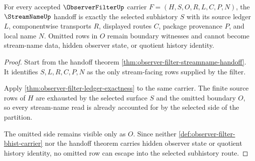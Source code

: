 \begin{theorem}
\label{thm:observer-filter-streamname-selected-subhistory-nonescape}
For every accepted $\ObserverFilterUp$ carrier $F=(H,S,O,R,L,C,P,N)$, the $\StreamNameUp$ handoff is exactly the selected subhistory $S$ with its source ledger $L$, componentwise transports $R$, displayed routes $C$, package provenance $P$, and local name $N$. Omitted rows in $O$ remain boundary witnesses and cannot become stream-name data, hidden observer state, or quotient history identity.
\end{theorem}
\begin{proof}
Start from the handoff theorem \autoref{thm:observer-filter-streamname-handoff}. It identifies $S,L,R,C,P,N$ as the only stream-facing rows supplied by the filter.

Apply \autoref{thm:observer-filter-ledger-exactness} to the same carrier. The finite source rows of $H$ are exhausted by the selected surface $S$ and the omitted boundary $O$, so every stream-name read is already accounted for by the selected side of the partition.

The omitted side remains visible only as $O$. Since neither \autoref{def:observer-filter-bhist-carrier} nor the handoff theorem carries hidden observer state or quotient history identity, no omitted row can escape into the selected subhistory route.
\end{proof}

